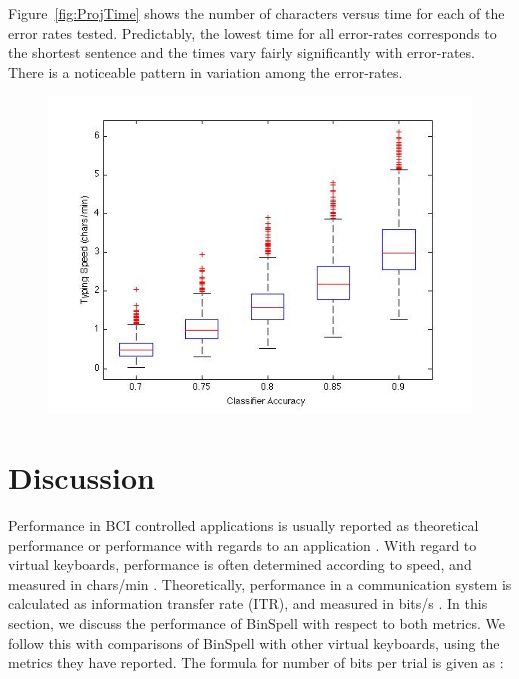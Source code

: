 \documentclass[12pt,titlepage]{article}
\begin{document}
Figure~\ref{fig:ProjTime} shows the number of characters versus time for each of the error rates tested. 
Predictably, the lowest time for all error-rates corresponds to the shortest sentence and the 
times vary fairly significantly with error-rates.  There is a noticeable pattern in variation among 
the error-rates.

\begin{figure}[t]
\begin{center}
	\includegraphics[scale=0.40]{ProjTypeSpeedComp.jpg}
	\label{fig:TypeSpeed}
\end{center}
\end{figure}

\section{Discussion}

Performance in BCI controlled applications is usually reported as theoretical performance or performance with regards to an application \cite{wolpaw_braincomputer_2002}.  With regard to virtual keyboards, performance is often determined according to speed, and measured in chars/min \cite{blankertz_berlin_2006} \cite{donchin_mental_2000} \cite{wolpaw_braincomputer_2002}.  Theoretically, performance in a communication system is calculated as information transfer rate (ITR), and measured in bits/s \cite{wolpaw_braincomputer_2002}.  In this section, we discuss the performance of BinSpell with respect to both metrics.  We follow this with comparisons of BinSpell with other virtual keyboards, using the metrics they have reported.  The formula for number of bits per trial is given as \cite{mcfarland2003brain}:
\end{document}
